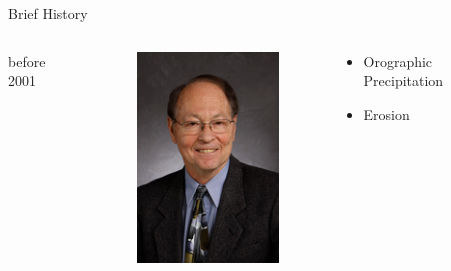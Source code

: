 \documentclass[hide notes,intlimits]{beamer}
\begin{document}
\begin{frame}{Brief History}
  \begin{columns}
    \begin{column}{.1\linewidth}
      before 2001
    \end{column}
    \begin{column}{.1\linewidth}
      \begin{figure}
        \includegraphics[width=\textwidth]{craig_lingle}
      \end{figure}
    \end{column}
    \begin{column}{.55\linewidth}
      \begin{itemize}
      \item Orographic Precipitation
      \item Erosion
      \end{itemize}
    \end{column}
  \end{columns}  

\end{frame}
\end{document}
